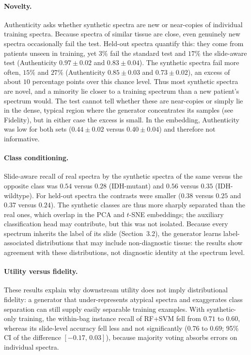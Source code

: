 \documentclass[12pt]{article}
\theoremstyle{paper}
\begin{document}
\paragraph{Novelty.}
Authenticity asks whether synthetic spectra are new or near-copies of individual training spectra.
Because spectra of similar tissue are close, even genuinely new spectra occasionally fail the test.
Held-out spectra quantify this: they come from patients unseen in training, yet $3\%$ fail the
standard test and $17\%$ the slide-aware test (Authenticity $0.97\pm0.02$ and $0.83\pm0.04$). The
synthetic spectra fail more often, $15\%$ and $27\%$ (Authenticity $0.85\pm0.03$ and $0.73\pm0.02$),
an excess of about $10$ percentage points over this chance level. Thus most synthetic spectra are
novel, and a minority lie closer to a training spectrum than a new patient's spectrum would. The
test cannot tell whether these are near-copies or simply lie in the dense, typical region where the
generator concentrates its samples (see Fidelity), but in either case the excess is small. In the
embedding, Authenticity was low for both sets ($0.44\pm0.02$ versus $0.40\pm0.04$) and therefore not
informative.

\paragraph{Class conditioning.}
Slide-aware recall of real spectra by the synthetic spectra of the same versus the opposite class was
$0.54$ versus $0.28$ (IDH-mutant) and $0.56$ versus $0.35$ (IDH-wildtype). For held-out spectra the
contrasts were smaller ($0.38$ versus $0.25$ and $0.37$ versus $0.24$). The synthetic classes are
thus more sharply separated than the real ones, which overlap in the PCA and $t$-SNE embeddings; the
auxiliary classification head may contribute, but this was not isolated. Because every spectrum
inherits the label of its slide (Section~3.2), the generator learns label-associated distributions
that may include non-diagnostic tissue: the results show agreement with these distributions, not
diagnostic identity at the spectrum level.

\paragraph{Utility versus fidelity.}
These results explain why downstream utility does not imply distributional fidelity: a generator
that under-represents atypical spectra and exaggerates class separation can still supply easily
separable training examples. With synthetic-only training, the within-bag instance recall of RF+SVM
fell from $0.71$ to $0.60$, whereas its slide-level accuracy fell less and not significantly
($0.76$ to $0.69$; 95\% CI of the difference $[-0.17,\,0.03]$), because majority voting absorbs
errors on individual spectra.
\end{document}
